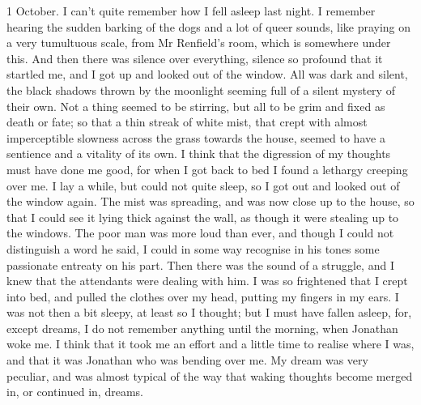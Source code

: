 \begin{diary}{1 October.}
I can't quite remember how I fell asleep last night. I remember hearing the sudden barking of the dogs and a lot of queer sounds, like praying on a very tumultuous scale, from Mr Renfield's room, which is somewhere under this. And then there was silence over everything, silence so profound that it startled me, and I got up and looked out of the window. All was dark and silent, the black shadows thrown by the moonlight seeming full of a silent mystery of their own. Not a thing seemed to be stirring, but all to be grim and fixed as death or fate; so that a thin streak of white mist, that crept with almost imperceptible slowness across the grass towards the house, seemed to have a sentience and a vitality of its own. I think that the digression of my thoughts must have done me good, for when I got back to bed I found a lethargy creeping over me. I lay a while, but could not quite sleep, so I got out and looked out of the window again. The mist was spreading, and was now close up to the house, so that I could see it lying thick against the wall, as though it were stealing up to the windows. The poor man was more loud than ever, and though I could not distinguish a word he said, I could in some way recognise in his tones some passionate entreaty on his part. Then there was the sound of a struggle, and I knew that the attendants were dealing with him. I was so frightened that I crept into bed, and pulled the clothes over my head, putting my fingers in my ears. I was not then a bit sleepy, at least so I thought; but I must have fallen asleep, for, except dreams, I do not remember anything until the morning, when Jonathan woke me. I think that it took me an effort and a little time to realise where I was, and that it was Jonathan who was bending over me. My dream was very peculiar, and was almost typical of the way that waking thoughts become merged in, or continued in, dreams.


\end{diary}
